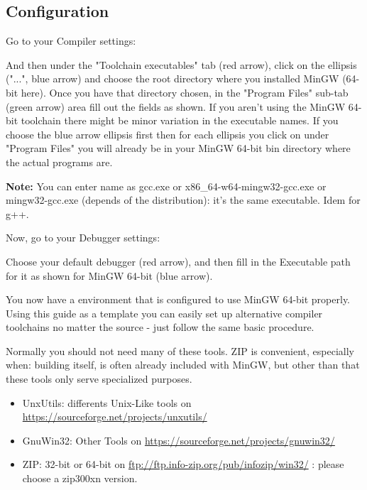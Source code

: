 \newpage
\subsection{\codeblocks Configuration}

Go to your Compiler settings:


And then under the "Toolchain executables" tab (red arrow), click on the ellipsis ("...", blue arrow) and choose the root directory where you installed MinGW (64-bit here). Once you have that directory chosen, in the "Program Files" sub-tab (green arrow) area fill out the fields as shown. If you aren't using the MinGW 64-bit toolchain there might be minor variation in the executable names. If you choose the blue arrow ellipsis first then for each ellipsis you click on under "Program Files" you will already be in your MinGW 64-bit bin directory where the actual programs are.


\textbf{Note:} You can enter name as gcc.exe or x86\_64-w64-mingw32-gcc.exe or mingw32-gcc.exe (depends of the distribution): it's the same executable. Idem for g++.


Now, go to your Debugger settings:


Choose your default debugger (red arrow), and then fill in the Executable path for it as shown for MinGW 64-bit (blue arrow).



You now have a \codeblocks environment that is configured to use MinGW 64-bit properly. Using this guide as a template you can easily set up alternative compiler toolchains no matter the source - just follow the same basic procedure.

Normally you should not need many of these tools. ZIP is convenient, especially when: building \codeblocks itself, is often already included with MinGW, but other than that these tools only serve specialized purposes.
\begin{itemize}
\item UnxUtils: differents Unix-Like tools on \url{https://sourceforge.net/projects/unxutils/}
\item GnuWin32: Other Tools on \url{https://sourceforge.net/projects/gnuwin32/}
\item ZIP: 32-bit or 64-bit on \url{ftp://ftp.info-zip.org/pub/infozip/win32/} : please choose a zip300xn version.
\end{itemize}

